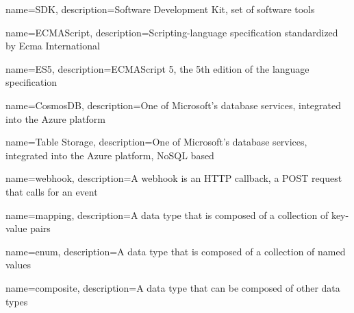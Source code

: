 {
	name=SDK,
	description={Software Development Kit, set of software tools}
}

{
	name=ECMAScript,
	description={Scripting-language specification standardized by Ecma International}
}

{
	name=ES5,
	description={ECMAScript 5, the 5th edition of the language specification}
}

{
	name=CosmosDB,
	description={One of Microsoft's database services, integrated into the Azure platform}
}

{
	name=Table Storage,
	description={One of Microsoft's database services, integrated into the Azure platform, NoSQL based}
}

{
	name=webhook,
	description={A webhook is an HTTP callback, a POST request that calls for an event}
}

{
	name=mapping,
	description={A data type that is composed of a collection of key-value pairs}
}

{
	name=enum,
	description={A data type that is composed of a collection of named values}
}

{
	name=composite,
	description={A data type that can be composed of other data types}
}